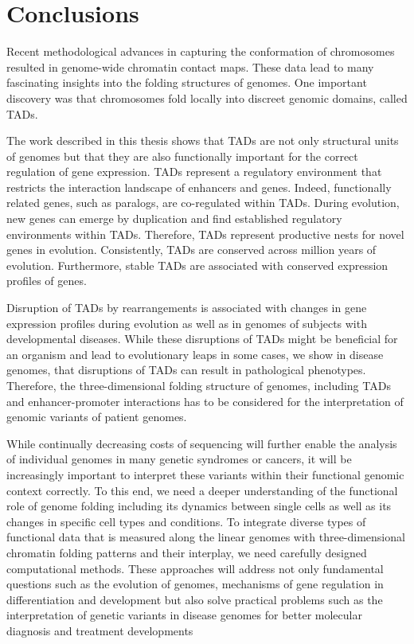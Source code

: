 \documentclass[a4paper,twoside=true,openright,parskip=full,chapterprefix=true,11pt,headings=normal,bibliography=totoc,listof=totoc,titlepage=on,captions=tableabove,draft=false]{scrreprt}
\theoremstyle{definition}
\theoremstyle{definition}
\theoremstyle{definition}
\theoremstyle{remark}
\begin{document}
\hypertarget{conclusions}{%
\section{Conclusions}\label{conclusions}}

Recent methodological advances in capturing the conformation of
chromosomes resulted in genome-wide chromatin contact maps. These data
lead to many fascinating insights into the folding structures of
genomes. One important discovery was that chromosomes fold locally into
discreet genomic domains, called TADs.

The work described in this thesis shows that TADs are not only
structural units of genomes but that they are also functionally
important for the correct regulation of gene expression. TADs represent
a regulatory environment that restricts the interaction landscape of
enhancers and genes. Indeed, functionally related genes, such as
paralogs, are co-regulated within TADs. During evolution, new genes can
emerge by duplication and find established regulatory environments
within TADs. Therefore, TADs represent productive nests for novel genes
in evolution. Consistently, TADs are conserved across million years of
evolution. Furthermore, stable TADs are associated with conserved
expression profiles of genes.

Disruption of TADs by rearrangements is associated with changes in gene
expression profiles during evolution as well as in genomes of subjects
with developmental diseases. While these disruptions of TADs might be
beneficial for an organism and lead to evolutionary leaps in some cases,
we show in disease genomes, that disruptions of TADs can result in
pathological phenotypes. Therefore, the three-dimensional folding
structure of genomes, including TADs and enhancer-promoter interactions
has to be considered for the interpretation of genomic variants of
patient genomes.

While continually decreasing costs of sequencing will further enable the
analysis of individual genomes in many genetic syndromes or cancers, it
will be increasingly important to interpret these variants within their
functional genomic context correctly. To this end, we need a deeper
understanding of the functional role of genome folding including its
dynamics between single cells as well as its changes in specific cell
types and conditions. To integrate diverse types of functional data that
is measured along the linear genomes with three-dimensional chromatin
folding patterns and their interplay, we need carefully designed
computational methods. These approaches will address not only
fundamental questions such as the evolution of genomes, mechanisms of
gene regulation in differentiation and development but also solve
practical problems such as the interpretation of genetic variants in
disease genomes for better molecular diagnosis and treatment
developments
\end{document}
